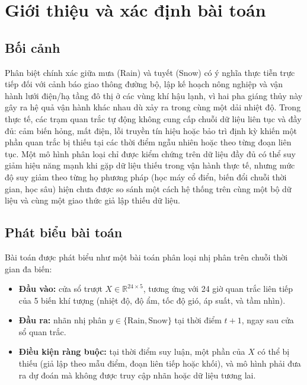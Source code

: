 \section{Giới thiệu và xác định bài toán}
\label{sec:gioi-thieu}

\subsection{Bối cảnh}
\label{sec:boi-canh}

Phân biệt chính xác giữa mưa (Rain) và tuyết (Snow) có ý nghĩa thực tiễn trực tiếp đối
với cảnh báo giao thông đường bộ, lập kế hoạch nông nghiệp và vận hành lưới điện/hạ tầng
đô thị ở các vùng khí hậu lạnh, vì hai pha giáng thủy này gây ra hệ quả vận hành khác
nhau dù xảy ra trong cùng một dải nhiệt độ. Trong thực tế, các trạm quan trắc tự động
không cung cấp chuỗi dữ liệu liên tục và đầy đủ: cảm biến hỏng, mất điện, lỗi truyền tín
hiệu hoặc bảo trì định kỳ khiến một phần quan trắc bị thiếu tại các thời điểm ngẫu nhiên
hoặc theo từng đoạn liên tục. Một mô hình phân loại chỉ được kiểm chứng trên dữ liệu đầy
đủ có thể suy giảm hiệu năng mạnh khi gặp dữ liệu thiếu trong vận hành thực tế, nhưng mức
độ suy giảm theo từng họ phương pháp (học máy cổ điển, biến đổi chuỗi thời gian, học sâu)
hiện chưa được so sánh một cách hệ thống trên cùng một bộ dữ liệu và cùng một giao thức
giả lập thiếu dữ liệu.

\subsection{Phát biểu bài toán}
\label{sec:phat-bieu-bai-toan}

Bài toán được phát biểu như một bài toán phân loại nhị phân trên chuỗi thời gian đa biến:

\begin{itemize}
  \item \textbf{Đầu vào:} cửa sổ trượt $X \in \mathbb{R}^{24 \times 5}$, tương ứng với
        24 giờ quan trắc liên tiếp của 5 biến khí tượng (nhiệt độ, độ ẩm, tốc độ gió, áp
        suất, và tầm nhìn).
  \item \textbf{Đầu ra:} nhãn nhị phân $y \in \{\text{Rain}, \text{Snow}\}$ tại thời
        điểm $t+1$, ngay sau cửa sổ quan trắc.
  \item \textbf{Điều kiện ràng buộc:} tại thời điểm suy luận, một phần của $X$ có thể bị
        thiếu (giả lập theo mẫu điểm, đoạn liên tiếp hoặc khối), và mô hình phải đưa ra
        dự đoán mà không được truy cập nhãn hoặc dữ liệu tương lai.
\end{itemize}

